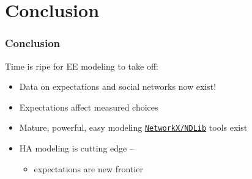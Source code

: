 \documentclass[pdflatex]{beamer}
\begin{document}
\section{Conclusion}
\begin{frame}
	\frametitle{Conclusion}

Time is ripe for EE modeling to take off:
\begin{itemize}
    \item Data on expectations and social networks now exist!
    \item Expectations affect measured choices
    \item Mature, powerful, easy modeling \href{https://https://ndlib.readthedocs.io/en/latest/}{\texttt{NetworkX/NDLib}} tools exist
    \item HA modeling is cutting edge --
    \begin{itemize}
        \item     expectations are new frontier
    \end{itemize}
\end{itemize}

\end{frame}



\def\newblock{\hskip .11em plus .33em minus .07em}

\begin{frame}
\renewcommand{\bibsection}{\subsubsection*{\bibname }}
\tiny


%

\end{frame}
\end{document}
